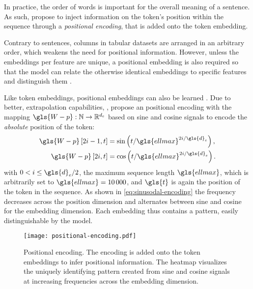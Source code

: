 In practice, the order of words is important for the overall meaning of a sentence. As such, \textcite[][6]{vaswaniAttentionAllYou2017} propose to inject information on the \gls{token}'s position within the sequence through a \emph{positional encoding}, that is added onto the \gls{token} embedding.

Contrary to sentences, columns in tabular datasets are arranged in an arbitrary order, which weakens the need for positional information. However, unless the embeddings per feature are unique, a positional embedding is also required so that the model can relate the otherwise identical embeddings to specific features and distinguish them \autocites[][3]{huangTabTransformerTabularData2020}[][15]{somepalliSaintImprovedNeural2021}.

Like \gls{token} embeddings, positional embeddings can also be learned \autocite[cp.][4174]{devlinBERTPretrainingDeep2019}. Due to better, extrapolation capabilities, \textcite[][6]{vaswaniAttentionAllYou2017}, propose an positional encoding with the mapping $\gls{W-p}: \mathbb{N} \rightarrow \mathbb{R}^{d_{e}}$ based on sine and cosine signals to encode the \emph{absolute} position of the \gls{token}:
\begin{equation}
    \begin{aligned}
        \gls{W-p}\left[2 i-1, t\right] & =\sin \left(t / \gls{ellmax}^{2 i / \gls{d}_e}\right), \\
        \gls{W-p}\left[2 i, t\right]   & =\cos \left(t / \gls{ellmax}^{2 i / \gls{d}_e}\right).
    \end{aligned}
    \label{eq:sinusodal-encoding}
\end{equation}
with $0<i \leq \gls{d}_{e} / 2$, the maximum sequence length $\gls{ellmax}$, which is arbitrarily set to $\gls{ellmax}=\num{10000}$, and $\gls{t}$ is again the position of the \gls{token} in the sequence. As shown in \cref{eq:sinusodal-encoding} the frequency decreases across the position dimension and alternates between sine and cosine for the embedding dimension. Each embedding thus contains a pattern, easily distinguishable by the model.

\begin{figure}[ht]
    \centering
    \texttt{[image: positional-encoding.pdf]}
    \caption[Positional Encoding of Transformer]{Positional encoding. The encoding is added onto the \gls{token} embeddings to infer positional information. The heatmap visualizes the uniquely identifying pattern created from sine and cosine signals at increasing frequencies across the embedding dimension.}
    \label{fig:positional-embedding}
\end{figure}

